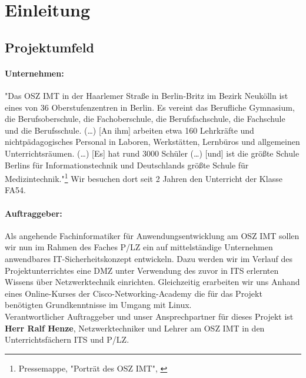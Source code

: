 \section{Einleitung}
\label{sec:Einleitung}

\subsection{Projektumfeld} 
\label{sec:Projektumfeld}
\paragraph*{Unternehmen: } "Das OSZ IMT  in der Haarlemer Straße in Berlin-Britz im Bezirk Neukölln ist eines von 36 Oberstufenzentren in Berlin. Es vereint das Berufliche Gymnasium, die Berufsoberschule, die Fachoberschule, die Berufsfachschule, die Fachschule und die Berufsschule. (\dots)
[An ihm] arbeiten etwa 160 Lehrkräfte und nichtpädagogisches Personal in Laboren, Werkstätten, Lernbüros und allgemeinen Unterrichtsräumen. (\dots)
[Es] hat rund 3000 Schüler (\dots) [und] ist die größte Schule Berlins für Informationstechnik und Deutschlands größte Schule für Medizintechnik."\footnote{Pressemappe, "Porträt des OSZ IMT", \cite{oszimtDe} }
Wir besuchen dort seit 2  Jahren den Unterricht der Klasse \ac{FA54}.
\paragraph*{Auftraggeber: } Als angehende Fachinformatiker für Anwendungsentwicklung am OSZ IMT sollen wir nun im Rahmen des Faches \ac{P/LZ} ein auf mittelständige Unternehmen anwendbares IT-Sicherheitskonzept entwickeln. Dazu werden wir im Verlauf des Projektunterrichtes eine \ac{DMZ} unter Verwendung des zuvor in \ac{ITS} erlernten Wissens über Netzwerktechnik einrichten.  Gleichzeitig erarbeiten wir uns Anhand eines Online-Kurses der Cisco-Networking-Academy die für das Projekt benötigten Grundkenntnisse im Umgang mit Linux.\\
\noindent\hspace*{3mm} Verantwortlicher Auftraggeber und unser Ansprechpartner für dieses Projekt ist \textbf{Herr Ralf Henze}, Netzwerktechniker und Lehrer am OSZ IMT in den Unterrichtsfächern \ac{ITS} und \ac{P/LZ}.

